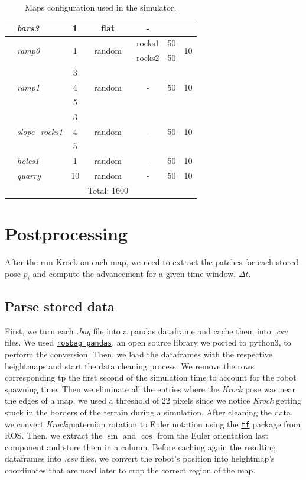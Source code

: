 \documentclass[../document.tex]{subfiles}
\begin{document}
\begin{table}[H]
\begin{tabular}[]{@{}llccccc@{}}
      \hline
      &\emph{bars3} & 1 & flat  & - &  &  \\
      \hline
      &\multirow{2}{*}{\emph{ramp0}} & \multirow{2}{*}{1} & \multirow{2}{*}{random} & rocks1 & 50 & \multirow{2}{*}{10} \\
      &&&& rocks2 & 50 &  \\
      \hline
      &\multirow{3}{*}{\emph{ramp1}} & 3 & \multirow{3}{*}{random} & \multirow{3}{*}{-} & \multirow{3}{*}{50} & \multirow{3}{*}{10} \\
      && 4 &&&& \\
      && 5 &&&& \\
      \hline 
      &\multirow{3}{*}{\emph{slope\_rocks1}} & 3 & \multirow{3}{*}{random} & \multirow{3}{*}{-} & \multirow{3}{*}{50} & \multirow{3}{*}{10} \\
      && 4 &&&& \\
      && 5 &&&& \\
      \hline
      &\emph{holes1} & 1 &random & - & 50 & 10 \\
      \hline
      &\emph{quarry} & 10 &random & - & 50 & 10 \\
      &&& Total: 1600 \\ 
      \bottomrule   
    \end{tabular}
    \label{table: maps}
    \caption{Maps configuration used in the simulator.}
  \end{table}

\section{Postprocessing}
After the run Krock on each map, we need to extract the patches for each stored pose $p_i$ and compute the advancement for a given time window, $\Delta t$.
\subsection{Parse stored data}
First, we turn each \emph{.bag} file into a pandas dataframe and cache them into \emph{.csv} files. We used \href{https://github.com/aktaylor08/RosbagPandas}{\texttt{rosbag\_pandas}}, an open source library we ported to python3, to perform the conversion.
Then, we load the dataframes with the respective heightmaps and start the data cleaning process. We remove the rows corresponding tp the first second of the simulation time to account for the robot spawning time. Then we eliminate all the entries where the \emph{Krock} pose was near the edges of a map, we used a threshold of $22$ pixels since we notice  \emph{Krock} getting stuck in the borders of the terrain during a simulation. 
After cleaning the data, we convert \emph{Krock}quaternion rotation to Euler notation using the \href{https://duckduckgo.com/?q=ros+tf&atb=v154-1__&ia=web}{\texttt{tf}} package from ROS. Then, we extract the $\sin$ and $\cos$ from the Euler orientation last component and store them in a column.
Before caching again the resulting dataframes into \emph{.csv} files, we convert the robot's position into heightmap's coordinates that are used later to crop the correct region of the map.
\end{document}
